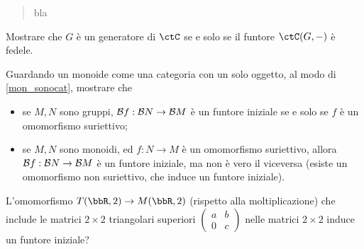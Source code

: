 \begin{esercizi}
	\begin{quote}
		bla
	\end{quote}
	Mostrare che \(G\) è un generatore di \(\ctC\) se e solo se il funtore \(\Hom\ctC(G,-)\) è fedele.
	\item \label{ex_monepi_5} Guardando un monoide come una categoria con un solo oggetto, al modo di \ref{mon_sonocat}, mostrare che
	\begin{itemize}
		\item se \(M,N\) sono gruppi, \(\mathcal{B} f : \mathcal{B} N\to \mathcal{B} M\) è un funtore iniziale se e solo se \(f\) è un omomorfismo suriettivo;
		\item se \(M,N\) sono monoidi, ed \(f : N\to M\) è un omomorfismo suriettivo, allora \(\mathcal{B} f : \mathcal{B} N\to \mathcal{B} M\) è un funtore iniziale, ma non è vero il viceversa (esiste un omomorfismo non suriettivo, che induce un funtore iniziale). %
	\end{itemize}
	L'omomorfismo \(T(\bbR,2) \to M(\bbR,2)\) (rispetto alla moltiplicazione) che include le matrici \(2\times 2\) triangolari superiori \(\left(\begin{smallmatrix} a	&	b\\ 0 & c		\end{smallmatrix}\right)\)	nelle matrici \(2\times 2\) induce un funtore iniziale?
\end{esercizi}